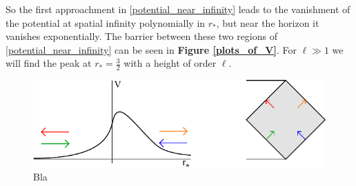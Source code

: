 	So the first approachment in \eqref{potential_near_infinity} leads to the vanishment of the potential at spatial infinity polynomially in $r_*$, but near the horizon it vanishes exponentially.
	The barrier between these two regions of \eqref{potential_near_infinity} can be seen in \textbf{Figure \ref{plots_of_V}}. For $\ell \gg 1$ we will find the peak at $r_* = \frac{3}{2}$ with a height of order $\ell$.
	
	 	
	\begin{figure} [tbp]
		\begin{center}
			\includegraphics[scale=1.6]{schscat}
			\caption{Bla} 
		\end{center}
	\end{figure}